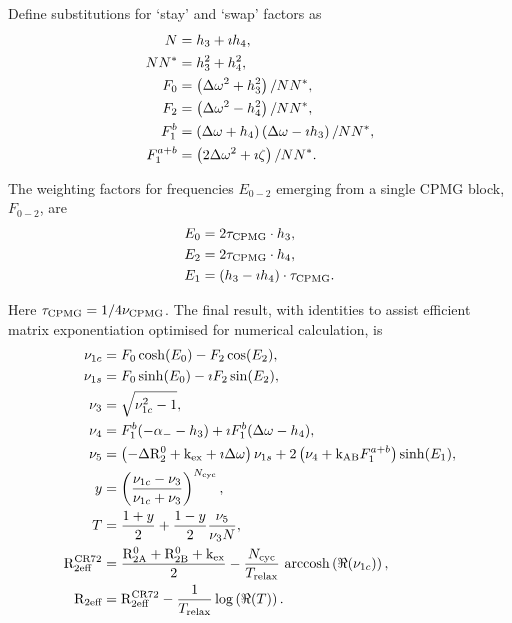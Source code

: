 Define substitutions for `stay' and `swap' factors as
\begin{subequations}
\begin{align}
	N & = h_3 + \imath h_4 , \\
	NN^* & = h_3^2 + h_4^2 , \\
	F_0 & = \left(\Delta\omega^2 + h_3^2\right) / NN^* , \\
	F_2 & = \left(\Delta\omega^2 - h_4^2\right) / NN^* , \\
	F_1^b & = \left(\Delta\omega + h_4\right) \left(\Delta\omega - \imath h_3\right) / NN^* , \\
	F_1^{a+b} & = \left(2\Delta\omega^2 + \imath \zeta\right) / NN^* .
\end{align}
\end{subequations}

The weighting factors for frequencies $E_{0-2}$ emerging from a single CPMG block, $F_{0-2}$, are
\begin{subequations}
\begin{align}
	E_0 & =  2 \tau_{\textrm{CPMG}} \cdot h_3 , \\
	E_2 & =  2 \tau_{\textrm{CPMG}} \cdot  h_4 , \\
	E_1 & = (h_3 - \imath h_4) \cdot \tau_{\textrm{CPMG}} .
\end{align}
\end{subequations}

Here $\tau_{\textrm{CPMG}} = 1 / 4\nu_{\textrm{CPMG}}$.
The final result, with identities to assist efficient matrix exponentiation optimised for numerical calculation, is
\begin{subequations}
\begin{align}
	\nu_{1c} & = F_0  \cosh(E_0) - F_2 \cos(E_2) , \\
	\nu_{1s} & = F_0  \sinh(E_0) - \imath F_2 \sin(E_2), \\
	\nu_3 & = \sqrt{\nu_{1c}^2 - 1} , \\
	\nu_4 & = F_1^b (-\alpha_- - h_3) + \imath F_1^b (\Delta\omega - h_4) , \\
	\nu_5 & = \left(-\Delta \mathrm{R}_2^0 + \textrm{k}_{\textrm{ex}} + \imath \Delta\omega\right) \nu_{1s} + 2 \left(\nu_4 + \textrm{k}_{\textrm{AB}} F_1^{a+b}\right) \sinh(E_1) , \\
    y & = \left( \frac{\nu_{1c} - \nu_3}{\nu_{1c} + \nu_3} \right) ^{N_{\textrm{cyc}}} , \\
	T & = \frac{1 + y}{2} + \frac{1 - y}{2} \frac{\nu_5}{\nu_3 N} , \\
	\mathrm{R}_{\textrm{2eff}}^{\textrm{CR72}} & = \frac{\mathrm{R}_{\mathrm{2A}}^0 + \mathrm{R}_{\mathrm{2B}}^0 + \textrm{k}_{\textrm{ex}}}{2} - \frac{N_{\textrm{cyc}}}{T_{\textrm{relax}}} \, \operatorname{arccosh}\left(\Re(\nu_{1c})\right) , \\
	\mathrm{R}_{\textrm{2eff}} & = \mathrm{R}_{\textrm{2eff}}^{\textrm{CR72}} - \frac{1}{T_{\textrm{relax}}} \log\left(\Re(T)\right) .
\end{align}
\end{subequations}

